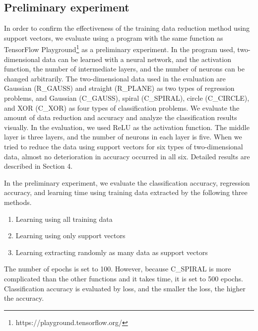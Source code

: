 \subsection{Preliminary experiment}
In order to confirm the effectiveness of the training data reduction method using support vectors, we evaluate using a program with the same function as TensorFlow Playground\footnote{https://playground.tensorflow.org/} as a preliminary experiment. In the program used, two-dimensional data can be learned with a neural network, and the activation function, the number of intermediate layers, and the number of neurons can be changed arbitrarily. The two-dimensional data used in the evaluation are Gaussian (R\_GAUSS) and straight (R\_PLANE) as two types of regression problems, and Gaussian (C\_GAUSS), spiral (C\_SPIRAL), circle (C\_CIRCLE), and XOR (C\_XOR) as four types of classification problems. We evaluate the amount of data reduction and accuracy and analyze the classification results visually. In the evaluation, we used ReLU as the activation function. The middle layer is three layers, and the number of neurons in each layer is five. When we tried to reduce the data using support vectors for six types of two-dimensional data, almost no deterioration in accuracy occurred in all six. Detailed results are described in Section 4. 

In the preliminary experiment, we evaluate the classification accuracy, regression accuracy, and learning time using training data extracted by the following three methods. 
\begin{enumerate}
\item Learning using all training data
\item Learning using only support vectors
\item Learning extracting randomly as many data as support vectors
\end{enumerate}
The number of epochs is set to 100. However, because C\_SPIRAL is more complicated than the other functions and it takes time, it is set to 500 epochs. Classification accuracy is evaluated by loss, and the smaller the loss, the higher the accuracy. 

